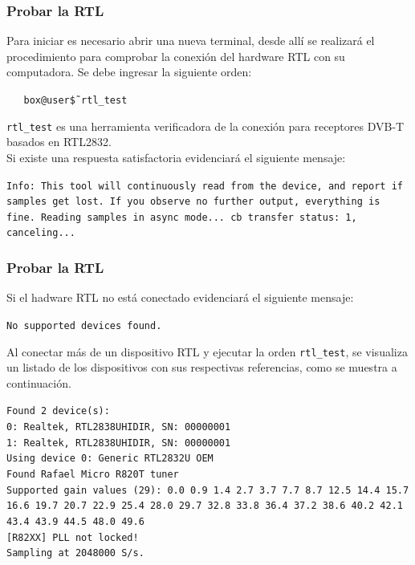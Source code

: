 \begin{frame}
\frametitle{Probar la RTL}

Para iniciar es necesario abrir una nueva terminal, desde allí se realizará el procedimiento para comprobar la conexión del hardware RTL con su computadora. \vspace{2mm}
Se debe ingresar la siguiente orden:

\begin{block}{}
    \texttt
    {\ \ \ box@user\~\$ rtl\_test}
    \end{block}

\texttt{rtl\_test} es una herramienta verificadora de la conexión para receptores DVB-T basados en RTL2832. \\ \vspace{2mm}
Si existe una respuesta satisfactoria evidenciará el siguiente mensaje:

\begin{block}{}
    \texttt
    {Info: This tool will continuously read from the device, and report if samples get lost. If you observe no further output, everything is fine. Reading samples in async mode... cb transfer status: 1, canceling...}
    \end{block}

\end{frame}

\begin{frame}
\frametitle{Probar la RTL}

Si el hadware RTL no está conectado evidenciará el siguiente mensaje:

\begin{block}{}
    \texttt
    {No supported devices found.}
    \end{block}

Al conectar más de un dispositivo RTL y ejecutar la orden \texttt{rtl\_test}, se visualiza un listado de los dispositivos con sus respectivas referencias, como se muestra a continuación.
    
    \begin{block}{}
    \texttt
    {Found 2 device(s):\\
    0:  Realtek, RTL2838UHIDIR, SN: 00000001\\ 
    1:  Realtek, RTL2838UHIDIR, SN: 00000001\\
    Using device 0: Generic RTL2832U OEM\\ 
    Found Rafael Micro R820T tuner\\ 
    Supported gain values (29): 0.0 0.9 1.4 2.7 3.7 7.7 8.7 12.5 14.4 15.7 16.6 19.7 20.7 22.9 25.4 28.0 29.7 32.8 33.8 36.4 37.2 38.6 40.2 42.1 43.4 43.9 44.5 48.0 49.6\\
    {[R82XX]} PLL not locked!\\
    Sampling at 2048000 S/s. 
}
    \end{block}

\end{frame}

